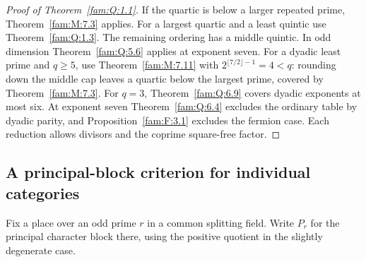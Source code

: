 \documentclass[11pt,a4paper]{article}
\numberwithin{equation}{section}
\theoremstyle{remark}
\begin{document}
\begin{proof}[Proof of Theorem~\ref{fam:Q:1.1}]
If the quartic is below a larger repeated prime, Theorem~\ref{fam:M:7.3}
applies. For a largest quartic and a least quintic use
Theorem~\ref{fam:Q:1.3}. The remaining ordering has a middle quintic.
In odd dimension Theorem~\ref{fam:Q:5.6} applies at exponent seven.
For a dyadic least prime and $q\ge5$, use Theorem~\ref{fam:M:7.11}
with $2^{\lfloor7/2\rfloor-1}=4<q$: rounding down the middle cap
leaves a quartic below the largest prime, covered by Theorem~\ref{fam:M:7.3}. For $q=3$, Theorem~\ref{fam:Q:6.9}
covers dyadic exponents at most six. At exponent seven
Theorem~\ref{fam:Q:6.4} excludes the ordinary table by dyadic
parity, and Proposition~\ref{fam:F:3.1} excludes the fermion case. Each reduction
allows divisors and the coprime square-free factor.
\end{proof}
\subsection{A principal-block criterion for individual categories}\label{fam:Q:sec:8}
Fix a place over an odd prime $r$ in a common splitting field. Write
$P_r$ for the principal character block there, using the positive
quotient in the slightly degenerate case.
\end{document}

